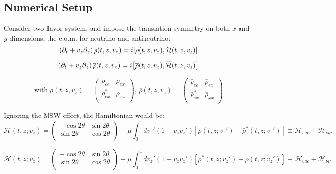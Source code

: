 \documentclass[11pt,a4paper]{article}
\begin{document}
 \subsection{Numerical Setup}%
 \label{sub:Perturbation from an initial state}

 Consider two-flavor system, and impose the translation symmetry on both $x$ and $y$ dimensions, the e.o.m. for neutrino and antineutrino: 
\begin{equation*}
   \left(   \partial _{t} + v_{z}\partial_{z}\right)\rho(t,z,v_{z}) = i \comm{\rho(t,z,v_{z})}{\mathcal{H}(t,z,v_{z})}
\end{equation*}

\begin{equation*}
   \left(   \partial _{t} + v_{z}\partial_{z}\right)\overline{\rho}(t,z,v_{z}) = i \comm{\overline{\rho}(t,z,v_{z})}{\overline{\mathcal{H}}(t,z,v_{z})}
\end{equation*}

\begin{equation*}
   \text{with } \rho(t,z,v_{z}) = \begin{pmatrix}
      \rho_{ee} & \rho_{ex}\\
      \rho^{*}_{ex} & \rho_{x x}\\
   \end{pmatrix} \text{, }
   \overline{\rho}(t,z,v_{z}) = \begin{pmatrix}
      \bar\rho_{ee} & \bar\rho_{ex}\\
      \bar\rho^{*}_{ex} & \bar\rho_{x x}\\
   \end{pmatrix}
\end{equation*}

\noindent Ignoring the MSW effect, the Hamiltonian would be: 
\begin{equation*}
   \mathcal{H}(t,z;v_z)=
\begin{pmatrix}
 -\cos 2\theta & \sin 2\theta\\
\sin 2\theta & \cos 2\theta \\
\end{pmatrix}
+
\mu \int_0^1 dv_z' (1-v_{z} v_z')
[\rho(t,z;v_z')-\bar\rho^*(t,z;v_z')]
\equiv \mathcal{H}_{vac} + \mathcal{H}_{\nu\nu},
\end{equation*}

\begin{equation*}
   \overline{\mathcal{H}}(t,z;v_z)=
\begin{pmatrix}
   -\cos 2\theta & \sin 2\theta\\
    \sin 2\theta & \cos 2\theta \\
\end{pmatrix}
-
\mu \int_0^1 dv_z' (1-v_{z} v_z')
[\rho^*(t,z;v_z')-\bar\rho(t,z;v_z')]
\equiv \overline{\mathcal{H}}_{vac} + \overline{\mathcal{H}}_{\nu\nu}
\end{equation*}
\end{document}
